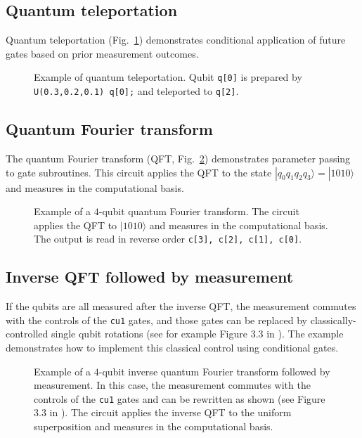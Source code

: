 \documentclass[USenglish,12pt,fleqn]{article} %
\newcommand*{\code}{\texttt}
\begin{document}

\subsection{Quantum teleportation}

Quantum teleportation (Fig.~\ref{fig:example:teleport}) demonstrates conditional application of future gates based on prior measurement outcomes.

\begin{figure}
\centering

\caption{Example of quantum teleportation. Qubit \code{q[0]} is prepared by \code{U(0.3,0.2,0.1) q[0];} and teleported to \code{q[2]}.
\label{fig:example:teleport}}
\end{figure}

\subsection{Quantum Fourier transform}
The quantum Fourier transform (QFT, Fig.~\ref{fig:example:qft}) demonstrates parameter passing to gate subroutines. This circuit applies the QFT to the state $|q_0 q_1 q_2 q_3\rangle=|1010\rangle$ and measures in the computational basis.

\begin{figure}
\centering

\caption{Example of a $4$-qubit quantum Fourier transform. The circuit applies the QFT to $|1010\rangle$ and measures in the computational basis. The output is read in reverse order \code{c[3], c[2], c[1], c[0]}. \label{fig:example:qft}}
\end{figure}

\subsection{Inverse QFT followed by measurement}

If the qubits are all measured after the inverse QFT, the measurement commutes with the controls of the \code{cu1} gates, and those gates can be replaced by classically-controlled single qubit rotations (see for example Figure 3.3 in \cite{mermin}). The example demonstrates how to implement this classical control using conditional gates.

\begin{figure}
\hspace{-0.8cm}
\begin{minipage}{.8\textwidth}

\end{minipage}
\caption{Example of a $4$-qubit inverse quantum Fourier transform followed by measurement. In this case, the measurement commutes with the controls of the \code{cu1} gates and can be rewritten as shown (see Figure 3.3 in \cite{mermin}). The circuit applies the inverse QFT to the uniform superposition and measures in the computational basis. 
\label{fig:example:iqft}}
\end{figure}
\end{document}
